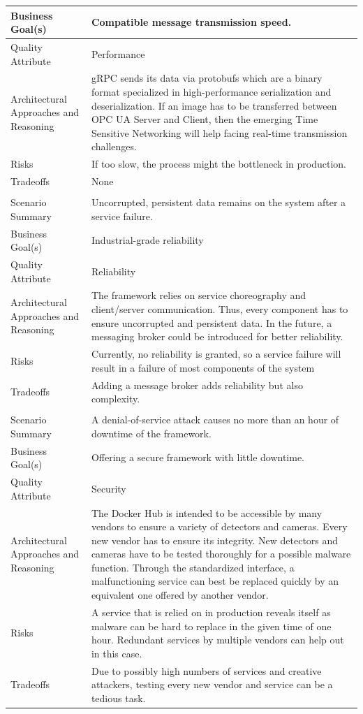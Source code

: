 {\begin{longtable}{| P{0.2\textwidth} | P{0.74\textwidth} |}
Business Goal(s) & Compatible message transmission speed.\\ \hline
Quality Attribute & Performance\\ \hline
Architectural Approaches and Reasoning &  gRPC sends its data via protobufs which are a binary format specialized in high-performance serialization and deserialization. If an image has to be transferred between OPC UA Server and Client, then the emerging Time Sensitive Networking will help facing real-time transmission challenges.\\ \hline
Risks & If too slow, the process might the bottleneck in production.\\ \hline
Tradeoffs &  None\\ \hline
{}
 \\ \hline
Scenario Summary & Uncorrupted, persistent data remains on the system after a service failure.\\ \hline
Business Goal(s) & Industrial-grade reliability \\ \hline
Quality Attribute & Reliability\\ \hline
Architectural Approaches and Reasoning & The framework relies on service choreography and client/server communication. Thus, every component has to ensure uncorrupted and persistent data. In the future, a messaging broker could be introduced for better reliability.\\ \hline
Risks & Currently, no reliability is granted, so a service failure will result in a failure of most components of the system \\ \hline
Tradeoffs & Adding a message broker adds reliability but also complexity. \\ \hline
{}
 \\ \hline
Scenario Summary & A denial-of-service attack causes no more than an hour of downtime of the framework.\\ \hline
Business Goal(s) & Offering a secure framework with little downtime. \\ \hline
Quality Attribute & Security\\ \hline
Architectural Approaches and Reasoning & The Docker Hub is intended to be accessible by many vendors to ensure a variety of detectors and cameras. Every new vendor has to ensure its integrity. New detectors and cameras have to be tested thoroughly for a possible malware function. Through the standardized interface, a malfunctioning service can best be replaced quickly by an equivalent one offered by another vendor.\\ \hline
Risks &  A service that is relied on in production reveals itself as malware can be hard to replace in the given time of one hour. Redundant services by multiple vendors can help out in this case.\\ \hline
Tradeoffs & Due to possibly high numbers of services and creative attackers, testing every new vendor and service can be a tedious task.\\ \hline
\end{longtable}
}

